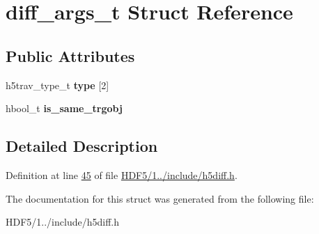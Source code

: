 \hypertarget{structdiff__args__t}{}\section{diff\+\_\+args\+\_\+t Struct Reference}
\label{structdiff__args__t}
\subsection*{Public Attributes}
\begin{DoxyCompactItemize}
\item 
\mbox{\label{structdiff__args__t_aa61309b0945b04e6f0ecbc4eb0c6d661}} 
h5trav\+\_\+type\+\_\+t {\bfseries type} \mbox{[}2\mbox{]}
\item 
\mbox{\label{structdiff__args__t_a0004b1e99a070778cc5e9c12d5981c27}} 
hbool\+\_\+t {\bfseries is\+\_\+same\+\_\+trgobj}
\end{DoxyCompactItemize}


\subsection{Detailed Description}


Definition at line \hyperlink{_h_d_f5_21_810_81_2include_2h5diff_8h_source_l00045}{45} of file \hyperlink{_h_d_f5_21_810_81_2include_2h5diff_8h_source}{H\+D\+F5/1../include/h5diff.\+h}.



The documentation for this struct was generated from the following file\+:\begin{DoxyCompactItemize}
\item 
H\+D\+F5/1../include/h5diff.\+h\end{DoxyCompactItemize}
